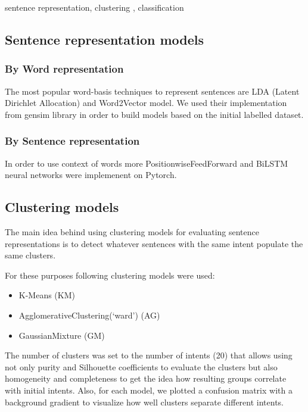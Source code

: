 \documentclass[11pt]{article}
\begin{document}
sentence representation, clustering , classification



\subsection{Sentence representation models}

\subsubsection{By Word representation}

The most popular word-basis techniques to represent sentences are LDA (Latent Dirichlet Allocation) and Word2Vector model. We used their implementation from gensim library in order to build models based on the initial labelled dataset.

\subsubsection{By Sentence representation}

In order to use context of words more PositionwiseFeedForward and BiLSTM neural networks were implemenent on Pytorch.



\subsection{Clustering models}

The main idea behind using clustering models for evaluating sentence representations is to detect whatever sentences with the same intent populate the same clusters.

For these purposes following clustering models were used: 
\begin{itemize}
\item K-Means (KM)
\item AgglomerativeClustering(‘ward’) (AG)
\item GaussianMixture (GM)
\end{itemize}

The number of clusters was set to the number of intents (20) that allows using not only purity and Silhouette coefficients to evaluate the clusters but also homogeneity and completeness to get the idea how resulting groups correlate with initial intents. Also, for each model, we plotted a confusion matrix with a background gradient to visualize how well clusters separate different intents.
\end{document}
